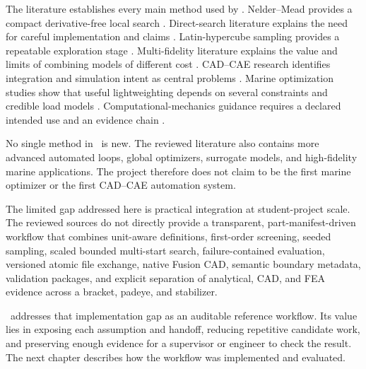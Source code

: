 The literature establishes every main method used by \NEMO. Nelder--Mead
provides a compact derivative-free local search
\cite{nelder1965,lagarias1998}. Direct-search literature explains the need for
careful implementation and claims \cite{kolda2003}. Latin-hypercube sampling
provides a repeatable exploration stage \cite{mckay1979}. Multi-fidelity
literature explains the value and limits of combining models of different
cost \cite{peherstorfer2018}. CAD--CAE research identifies integration and
simulation intent as central problems \cite{park2010,nolan2015,li2023}.
Marine optimization studies show that useful lightweighting depends on
several constraints and credible load models
\cite{gentils2017,zheng2023,wang2024}. Computational-mechanics guidance
requires a declared intended use and an evidence chain
\cite{asmeVV10,nasa7009}.

No single method in \NEMO\ is new. The reviewed literature also contains more
advanced automated loops, global optimizers, surrogate models, and
high-fidelity marine applications. The project therefore does not claim to be
the first marine optimizer or the first CAD--CAE automation system.

The limited gap addressed here is practical integration at student-project
scale. The reviewed sources do not directly provide a transparent,
part-manifest-driven workflow that combines unit-aware definitions,
first-order screening, seeded sampling, scaled bounded multi-start search,
failure-contained evaluation, versioned atomic file exchange, native Fusion
CAD, semantic boundary metadata, validation packages, and explicit separation
of analytical, CAD, and FEA evidence across a bracket, padeye, and stabilizer.

\NEMO\ addresses that implementation gap as an auditable reference workflow.
Its value lies in exposing each assumption and handoff, reducing repetitive
candidate work, and preserving enough evidence for a supervisor or engineer to
check the result. The next chapter describes how the workflow was implemented
and evaluated.
